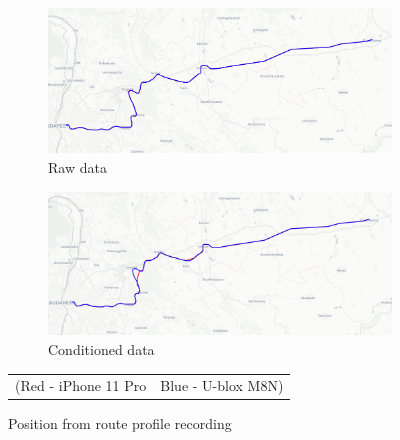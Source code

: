 \documentclass{article}
\begin{document}
			\begin{figure}[h]
				\centering
				\begin{subfigure}[b]{0.45\textwidth}
					\centering
			      \includegraphics[width=\textwidth]{raw_map.png}
			      \caption{Raw data}
				\end{subfigure}
				\begin{subfigure}[b]{0.45\textwidth}
					\centering
			      \includegraphics[width=\textwidth]{cond_map.png}
			      \caption{Conditioned data}
				\end{subfigure}
		   \caption{Position from route profile recording}
		   \begin{tabular}{c c}
				\footnotesize (Red - iPhone 11 Pro & \footnotesize Blue - U-blox M8N)
	      \end{tabular} 
		   \label{fig:route_map}
			\end{figure}
\end{document}
